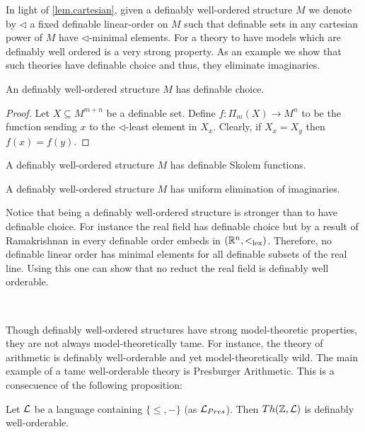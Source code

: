 In light of \ref{lem.cartesian}, given a definably well-ordered structure $M$ we denote by $\lhd$ a fixed definable linear-order on $M$ such that definable sets in any cartesian power of $M$ have $\lhd$-minimal elements. For a theory to have models which are definably well ordered is a very strong property. As an example we show that such theories have definable choice and thus, they eliminate imaginaries. 

\begin{prop}
An definably well-ordered structure $M$ has definable choice. 
\end{prop}

\begin{proof}
Let $X\subseteq M^{m+n}$ be a definable set. Define $f:\Pi_m(X)\rightarrow M^n$ to be the function sending $x$ to the $\lhd$-least element in $X_x$. Clearly, if $X_x=X_y$ then $f(x)=f(y)$. 
\end{proof}

\begin{cor}
A definably well-ordered structure $M$ has definable Skolem functions. 
\end{cor}

\begin{cor}
A definably well-ordered structure $M$ has uniform elimination of imaginaries. 
\end{cor}

Notice that being a definably well-ordered structure is stronger than to have definable choice. For instance the real field has definable choice but by a result of Ramakrishnan in \cite{ramakrishnan-12} every definable order embeds in $({\mathbb R}^n,<_{\text{lex}})$. Therefore, no definable linear order has minimal elements for all definable subsets of the real line. Using this one can show that no reduct the real field is definably well orderable. 

\

Though definably well-ordered structures have strong model-theoretic properties, they are not always model-theoretically tame. For instance, the theory of arithmetic is definably well-orderable and yet model-theoretically wild. The main example of a tame well-orderable theory is Presburger Arithmetic. This is a consecuence of the following proposition: 

\begin{prop}\label{preswellorder}
Let $\mathcal{L}$ be a language containing $\{\leq,-\}$ (as $\mathcal{L}_{Pres}$). Then $Th({\mathbb Z},\mathcal{L})$ is definably well-orderable.
\end{prop}

